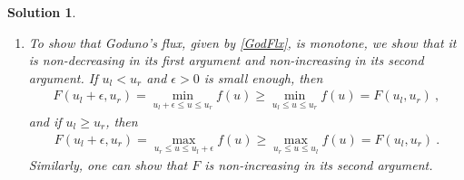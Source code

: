 \documentclass[10pt,letterpaper]{article}
\newcommand{\frb}[1]{ \left(  {#1} \right) }
\theoremstyle{break}
\newtheorem{mysolution}{Solution}
\newenvironment{solution}{\begin{mysolution}}{\end{mysolution}}
\begin{document}
\begin{solution}
\begin{enumerate}
        \item
        To show that Goduno's flux, given by \eqref{GodFlx}, is monotone, we show that it is non-decreasing in its first argument and non-increasing in its second argument.
        If $u_l<u_r$ and $\epsilon>0$ is small enough, then
        \begin{gather}
            F\frb{u_l+\epsilon,u_r}=\min_{u_l+\epsilon\le u\le u_r} f(u) \ge \min_{u_l\le u\le u_r} f(u)
                =F(u_l,u_r)\ ,
        \end{gather}
        and if $u_l\ge u_r$, then
        \begin{gather}
            F\frb{u_l+\epsilon,u_r}=\max_{u_r\le u\le u_l+\epsilon} f(u) \ge \max_{u_r\le u\le u_l} f(u)
                =F(u_l,u_r)\ .
        \end{gather}
        Similarly, one can show that $F$ is non-increasing in its second argument.
    \end{enumerate}
\end{solution}
\end{document}

